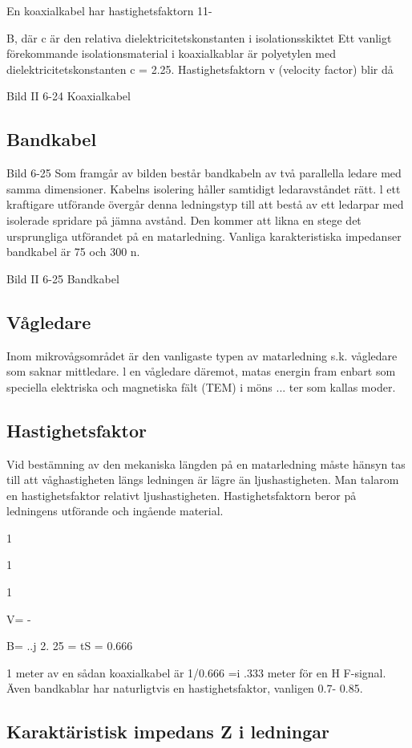 En koaxialkabel har hastighetsfaktorn
11-{B, där c är den relativa dielektricitetskonstanten i isolationsskiktet Ett vanligt förekommande isolationsmaterial i koaxialkablar är polyetylen med dielektricitetskonstanten c = 2.25.
Hastighetsfaktorn v (velocity factor) blir
då

Bild II 6-24 Koaxialkabel

\subsection{Bandkabel}

Bild 6-25
Som framgår av bilden består bandkabeln
av två parallella ledare med samma dimensioner. Kabelns isolering håller samtidigt
ledaravståndet rätt. l ett kraftigare utförande
övergår denna ledningstyp till att bestå av
ett ledarpar med isolerade spridare på jämna
avstånd. Den kommer att likna en stege det ursprungliga utförandet på en matarledning.
Vanliga karakteristiska impedanser
bandkabel är 75 och 300 n.

Bild II 6-25 Bandkabel

\subsection{Vågledare}

Inom mikrovågsområdet är den vanligaste
typen av matarledning s.k. vågledare som
saknar mittledare. l en vågledare däremot,
matas energin fram enbart som speciella
elektriska och magnetiska fält (TEM) i möns ...
ter som kallas moder.

\subsection{Hastighetsfaktor}

Vid bestämning av den mekaniska längden
på en matarledning måste hänsyn tas till att
våghastigheten längs ledningen är lägre än
ljushastigheten. Man talarom en hastighetsfaktor relativt ljushastigheten. Hastighetsfaktorn beror på ledningens utförande och
ingående material.

1

1

1

V= -{B= ..j 2. 25 = tS = 0.666

1 meter av en sådan koaxialkabel är
1/0.666 =i .333 meter för en H F-signal.
Även bandkablar har naturligtvis en
hastighetsfaktor, vanligen 0.7- 0.85.

\subsection{Karaktäristisk impedans Z i ledningar}

}}
